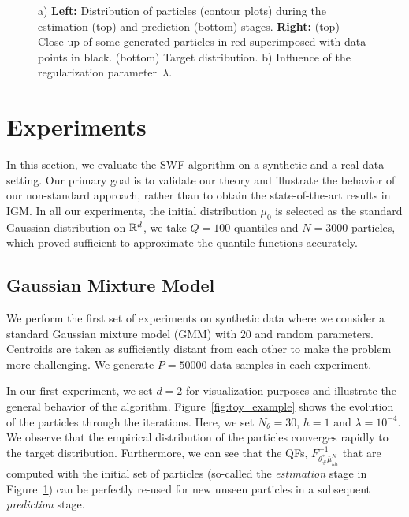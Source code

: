 
\begin{figure}
\centering
{} \hspace{30pt}
\caption{a) \textbf{Left:} Distribution of particles (contour plots) during the estimation (top) and prediction (bottom) stages. \textbf{Right:} (top) Close-up of some generated particles in red superimposed with data points in black. (bottom) Target distribution. b) Influence of the regularization parameter~$\lambda$. }
\label{fig:gmm1}
\end{figure}

\section{Experiments}


%
In this section, we evaluate the SWF algorithm on a synthetic and a real data setting. Our primary goal is to validate our theory and illustrate the behavior of our non-standard approach, rather than to obtain the state-of-the-art results in IGM. In all our experiments, the initial distribution $\mu_0$ is selected as the standard Gaussian distribution on $\mathbb{R}^d$, we take $Q=100$ quantiles and $N=3000$ particles, which proved sufficient to approximate the quantile functions accurately.


\subsection{Gaussian Mixture Model }
We perform the first set of experiments on synthetic data where we consider a standard Gaussian mixture model (GMM) with $20$ and random parameters. Centroids are taken as sufficiently distant from each other to make the problem more challenging. We generate $P=50000$ data samples in each experiment.

In our first experiment, we set $d=2$ for visualization purposes and illustrate the general behavior of the algorithm. Figure~\ref{fig:toy_example} shows the evolution of the particles through the iterations. Here, we set $N_\theta=30$, $h=1$ and $\lambda=10^{-4}$.
%
We observe that the empirical distribution of the particles converges rapidly to the target distribution. Furthermore, we can see that the QFs, $F^{-1}_{\theta^*_\#\bar{\mu}_{kh}^{N}}$ that are computed with the initial set of particles (so-called the \textit{estimation} stage in Figure~\ref{fig:gmm1}) can be perfectly re-used for new unseen particles in a subsequent \textit{prediction} stage.

